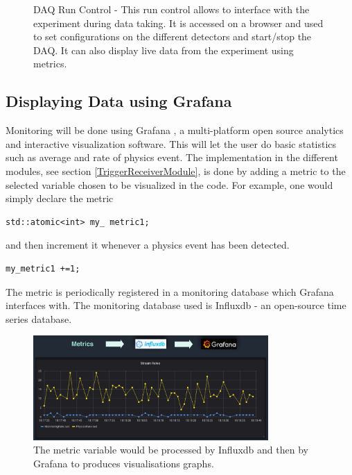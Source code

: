 \begin{figure}[htbp!] 
\centering    
{}
\caption[DAQ Run Control]{DAQ Run Control - This run control allows to interface with the experiment during data taking. It is accessed on a browser and used to set configurations on the different detectors and start/stop the DAQ. It can also display live data from the experiment using metrics.}
\label{fig:RunControl}
\end{figure}

\subsection{Displaying Data using Grafana}

Monitoring will be done using Grafana \cite{noauthor_grafana_nodate}, a multi-platform open source analytics and interactive visualization software. This will let the user do basic statistics such as average and rate of physics event. The implementation in the different modules, see section \ref{TriggerReceiverModule}, is done by adding a metric to the selected variable chosen to be visualized in the code. For example, one would simply declare the metric
\begin{lstlisting}
std::atomic<int> my_ metric1;
\end{lstlisting}
and then increment it whenever a physics event has been detected.
\begin{lstlisting}
my_metric1 +=1;
\end{lstlisting}
The metric is periodically registered in a monitoring database which Grafana interfaces with. The monitoring database used is Influxdb \cite{noauthor_influxdb_nodate} - an open-source time series database.

\begin{figure}[htbp!] 
\centering    
\includegraphics[width=0.8\textwidth]{ChapterDAQ/Figs/GeneralDAQ/Grafana.jpg}
\caption[Grafana]{The metric variable would be processed by Influxdb and then by Grafana to produces visualisations graphs.}
\label{fig:Grafana}
\end{figure}


